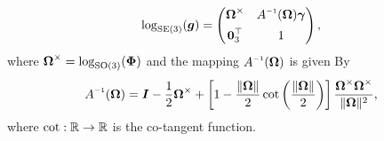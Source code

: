 %
\begin{equation}
    \log_{\SE{3}}(\gB) = \begin{pmatrix}
        \OmegaB^\times & A\inv(\OmegaB) \gammaB \\[0.45em]\vec{0}_3^\top & 1
        \end{pmatrix},
  \end{equation}
where $\boldsymbol{\Omega}^\times = \log_{\textup{\textrm{SO}}(3)}({\boldsymbol{\Phi}})$ and the mapping $A\inv(\OmegaB)$ is given By
%
\begin{equation}
A\inv(\OmegaB) = \IB - \frac{1}{2}\OmegaB^\times + \left[1 - \frac{\lVert \OmegaB \rVert}{2}\cot\left(\frac{\lVert \OmegaB \rVert}{2}\right) \right]  \frac{ \OmegaB^\times \OmegaB^\times }{\lVert \OmegaB \rVert^2},
\end{equation}
%
where $\cot: \mathbb{R} \to \mathbb{R}$ is the co-tangent function.
